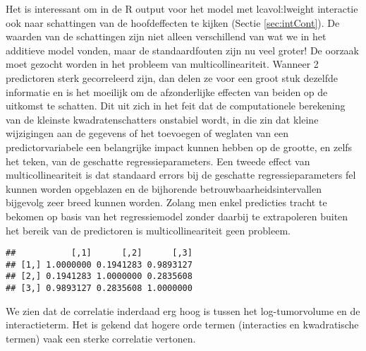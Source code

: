 \documentclass[12pt,dutch,coursenotes]{book}
\newenvironment{Shaded}{\begin{snugshade}}{\end{snugshade}}
\newcommand{\KeywordTok}[1]{\textcolor[rgb]{0.13,0.29,0.53}{\textbf{#1}}}
\newcommand{\StringTok}[1]{\textcolor[rgb]{0.31,0.60,0.02}{#1}}
\newcommand{\OperatorTok}[1]{\textcolor[rgb]{0.81,0.36,0.00}{\textbf{#1}}}
\newcommand{\NormalTok}[1]{#1}
\theoremstyle{definition}
\theoremstyle{definition}
\theoremstyle{definition}
\theoremstyle{remark}
\begin{document}
Het is interessant om in de R output voor het model met lcavol:lweight
interactie ook naar schattingen van de hoofdeffecten te kijken (Sectie
\ref{sec:intCont}). De waarden van de schattingen zijn niet alleen
verschillend van wat we in het additieve model vonden, maar de
standaardfouten zijn nu veel groter! De oorzaak moet gezocht worden in
het probleem van multicollineariteit. Wanneer 2 predictoren sterk
gecorreleerd zijn, dan delen ze voor een groot stuk dezelfde informatie
en is het moeilijk om de afzonderlijke effecten van beiden op de
uitkomst te schatten. Dit uit zich in het feit dat de computationele
berekening van de kleinste kwadratenschatters onstabiel wordt, in die
zin dat kleine wijzigingen aan de gegevens of het toevoegen of weglaten
van een predictorvariabele een belangrijke impact kunnen hebben op de
grootte, en zelfs het teken, van de geschatte regressieparameters. Een
tweede effect van multicollineariteit is dat standaard errors bij de
geschatte regressieparameters fel kunnen worden opgeblazen en de
bijhorende betrouwbaarheidsintervallen bijgevolg zeer breed kunnen
worden. Zolang men enkel predicties tracht te bekomen op basis van het
regressiemodel zonder daarbij te extrapoleren buiten het bereik van de
predictoren is multicollineariteit geen probleem.

\begin{Shaded}
\end{Shaded}

\begin{verbatim}
##           [,1]      [,2]      [,3]
## [1,] 1.0000000 0.1941283 0.9893127
## [2,] 0.1941283 1.0000000 0.2835608
## [3,] 0.9893127 0.2835608 1.0000000
\end{verbatim}

We zien dat de correlatie inderdaad erg hoog is tussen het
log-tumorvolume en de interactieterm. Het is gekend dat hogere orde
termen (interacties en kwadratische termen) vaak een sterke correlatie
vertonen.
\end{document}
